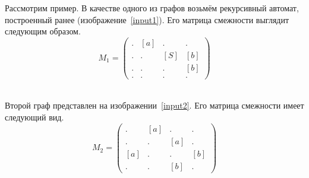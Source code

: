 \begin{example}
Рассмотрим пример.
В качестве одного из графов возьмём рекурсивный автомат, построенный ранее (изображение~\ref{input1}).
Его матрица смежности выглядит следующим образом.
$$ M_1 =
\begin{pmatrix}
. & [a] & . & . \\
. & . & [S] & [b] \\
. & . & . & [b] \\
. & . & . & .
\end{pmatrix}
$$

\begin{align}
\label{input2}
    
\end{align}

Второй граф представлен на изображении~\ref{input2}.
Его матрица смежности имеет следующий вид.
$$ M_2 =
\begin{pmatrix}
. & [a] & . & . \\
. & . & [a] & . \\
[a] & . & . & [b] \\
. & . & [b] & .
\end{pmatrix}
$$


\end{example}
